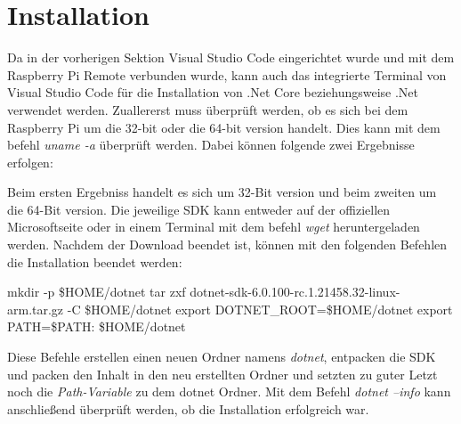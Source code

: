 \section{Installation}
\label{sec:installation}
Da in der vorherigen Sektion \emph{} Visual Studio Code
eingerichtet wurde und mit dem Raspberry Pi
Remote verbunden wurde, kann auch das integrierte Terminal von Visual Studio Code für die
Installation von .Net Core beziehungsweise .Net verwendet werden.
\newline
\newline
Zuallererst muss überprüft werden, ob es sich bei dem Raspberry Pi um die 32-bit oder die 64-bit
version handelt. Dies kann mit dem befehl \emph{uname -a} überprüft werden. Dabei können folgende
zwei Ergebnisse erfolgen:
Beim ersten Ergebniss handelt es sich um 32-Bit version und beim zweiten um die 64-Bit version.
\newline
\newline
Die jeweilige SDK kann entweder auf der offiziellen Microsoftseite oder in einem Terminal mit dem
befehl \emph{wget} heruntergeladen werden. Nachdem der Download
beendet ist, können mit den folgenden Befehlen die Installation beendet werden:
\begin{zitat}
    mkdir -p \$HOME/dotnet
    \newline
    tar zxf dotnet-sdk-6.0.100-rc.1.21458.32-linux-arm.tar.gz -C \$HOME/dotnet
    \newline
    export DOTNET\_ROOT=\$HOME/dotnet
    \newline
    export PATH=\$PATH: \$HOME/dotnet
\end{zitat}

Diese Befehle erstellen einen neuen Ordner namens \emph{dotnet}, entpacken die SDK und packen den
Inhalt in den neu erstellten Ordner und setzten zu guter Letzt noch die \emph{Path-Variable} zu
dem dotnet Ordner.
\newline
\newline
Mit dem Befehl \emph{dotnet --info} kann anschließend überprüft werden, ob die Installation
erfolgreich war.